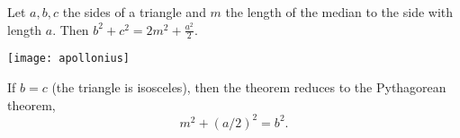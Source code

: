 \documentclass[12pt]{article}
\begin{document}

Let $a,b,c$ the sides of a triangle and $m$ the length of the median to the side with length $a$.
Then $b^2+c^2=2m^2+\frac{a^2}{2}$.
\begin{center}
\texttt{[image: apollonius]}
\end{center}

If $b=c$ (the triangle is isosceles), then the theorem reduces to the
Pythagorean theorem,
$$
   m^2 + (a/2)^2 = b^2.
$$
\end{document}
